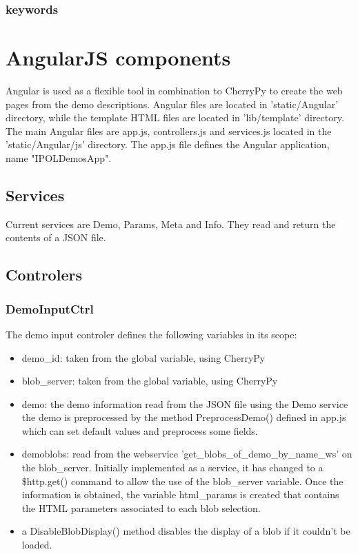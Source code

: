 \subsubsection{keywords}

\section{AngularJS components}
Angular is used as a flexible tool in combination to CherryPy to create the web 
pages from the demo descriptions. Angular files are located in 'static/Angular'
directory, while the template HTML files are located in 'lib/template' directory.
The main Angular files are app.js, controllers.js and services.js located in the
'static/Angular/js' directory.
The app.js file defines the Angular application, name "IPOLDemosApp".

\subsection{Services}
Current services are Demo, Params, Meta and Info. They read and return the contents
of a JSON file.

\subsection{Controlers}
\subsubsection{DemoInputCtrl}
The demo input controler defines the following variables in its scope:
\begin{itemize}
  \item demo\_id: taken from the global variable, using CherryPy
  \item blob\_server: taken from the global variable, using CherryPy
  \item demo: the demo information read from the JSON file using the Demo service
        the demo is preprocessed by the method PreprocessDemo() defined in app.js
        which can set default values and preprocess some fields.
  \item demoblobs: read from the webservice 'get\_blobs\_of\_demo\_by\_name\_ws' on the 
        blob\_server. Initially implemented as a service, it has changed to 
        a \$http.get() command to allow the use of the blob\_server variable.
        Once the information is obtained, the variable html\_params is created
        that contains the HTML parameters associated to each blob selection.
  \item a DisableBlobDisplay() method disables the display of a blob if it couldn't
        be loaded.
\end{itemize}

